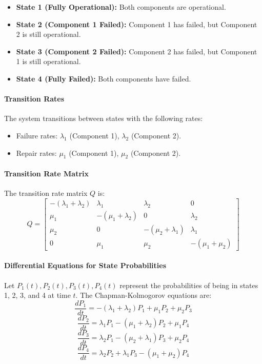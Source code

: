 \documentclass[a4paper,12pt]{article}
\begin{document}
\begin{answerbox}
	\begin{itemize}
		\item \textbf{State 1 (Fully Operational):} Both components are operational.
		\item \textbf{State 2 (Component 1 Failed):} Component 1 has failed, but Component 2 is still operational.
		\item \textbf{State 3 (Component 2 Failed):} Component 2 has failed, but Component 1 is still operational.
		\item \textbf{State 4 (Fully Failed):} Both components have failed.
	\end{itemize}
	
	\paragraph{Transition Rates}
	The system transitions between states with the following rates:
	\begin{itemize}
		\item Failure rates: \( \lambda_1 \) (Component 1), \( \lambda_2 \) (Component 2).
		\item Repair rates: \( \mu_1 \) (Component 1), \( \mu_2 \) (Component 2).
	\end{itemize}
	
	\paragraph{Transition Rate Matrix}
	The transition rate matrix \( Q \) is:
	\[
	Q =
	\begin{bmatrix}
		-(\lambda_1 + \lambda_2) & \lambda_1 & \lambda_2 & 0 \\
		\mu_1 & -(\mu_1 + \lambda_2) & 0 & \lambda_2 \\
		\mu_2 & 0 & -(\mu_2 + \lambda_1) & \lambda_1 \\
		0 & \mu_1 & \mu_2 & -(\mu_1 + \mu_2)
	\end{bmatrix}
	\]
	
	
	\paragraph{Differential Equations for State Probabilities}
	Let \( P_1(t), P_2(t), P_3(t), P_4(t) \) represent the probabilities of being in states 1, 2, 3, and 4 at time \( t \). The Chapman-Kolmogorov equations are:
	\[
	\frac{dP_1}{dt} = -(\lambda_1 + \lambda_2)P_1 + \mu_1 P_2 + \mu_2 P_3
	\]
	\[
	\frac{dP_2}{dt} = \lambda_1 P_1 - (\mu_1 + \lambda_2)P_2 + \mu_1 P_4
	\]
	\[
	\frac{dP_3}{dt} = \lambda_2 P_1 - (\mu_2 + \lambda_1)P_3 + \mu_2 P_4
	\]
	\[
	\frac{dP_4}{dt} = \lambda_2 P_2 + \lambda_1 P_3 - (\mu_1 + \mu_2)P_4
	\]
	

\end{answerbox}
\end{document}
